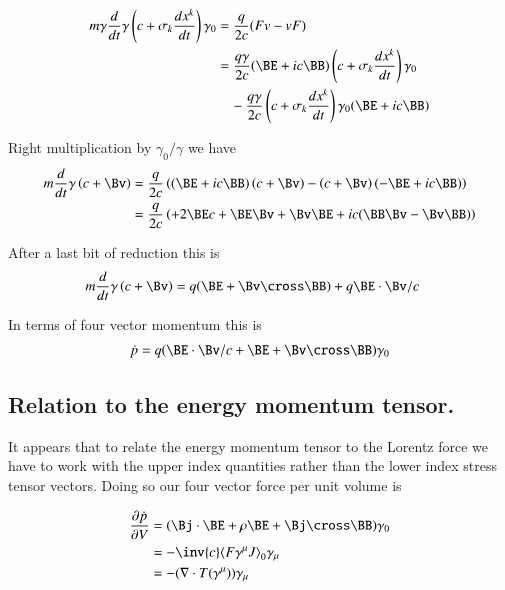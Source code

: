 \begin{align*}
m \gamma \frac{d}{dt} \gamma \left(c + \sigma_k \frac{dx^k}{dt}\right) \gamma_0
&= \frac{q}{2c}(F v - v F) \\
&=
\frac{q \gamma}{2c} 
(\BE + i c\BB) 
\left(c + \sigma_k \frac{dx^k}{dt}\right) \gamma_0
\\
&\quad -
\frac{q \gamma}{2c} 
\left(c + \sigma_k \frac{dx^k}{dt}\right) \gamma_0
(\BE + i c\BB) \\
\end{align*}

Right multiplication by $\gamma_0/\gamma$ we have
\begin{align*}
m \frac{d}{dt} \gamma \left(c + \Bv \right) 
&= \frac{q }{2c} \left( (\BE + i c\BB) \left(c + \Bv \right) -\left(c + \Bv \right) (-\BE + i c\BB) \right) \\
&= \frac{q }{2c} \left( 
+ 2 \BE c 
+ \BE \Bv  + \Bv \BE 
+ i c (\BB \Bv  - \Bv \BB)
\right) \\
\end{align*}

After a last bit of reduction this is
\begin{align}
m \frac{d}{dt} \gamma \left(c + \Bv \right) &= q (\BE + \Bv \cross \BB) + q \BE \cdot \Bv/c
\end{align}

In terms of four vector momentum this is
\begin{align}\label{eqn:seLorentz:lorentzForceVec}
\dot{p} = q ( \BE \cdot \Bv/c + \BE + \Bv \cross \BB ) \gamma_0
\end{align}

\subsection{Relation to the energy momentum tensor. }

It appears that to relate the energy momentum tensor to the Lorentz force we have 
to work with the upper index quantities rather than the lower index stress tensor vectors.  Doing so
our four vector force per unit volume is
 
\begin{align}
\PD{V}{\dot{p}}
&= (\Bj \cdot \BE + \rho \BE + \Bj \cross \BB) \gamma_0 \\
&= - \inv{c} \gpgradezero{ F \gamma^\mu J } \gamma_\mu \\
&= - (\grad \cdot T(\gamma^\mu)) \gamma_\mu
\end{align}

